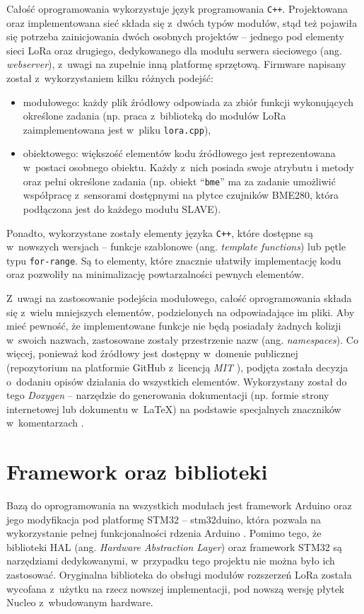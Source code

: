 Całość oprogramowania wykorzystuje język programowania \texttt{C++}. Projektowana oraz implementowana sieć składa się
z~dwóch typów modułów, stąd też pojawiła się potrzeba zainicjowania dwóch osobnych projektów -- jednego pod elementy
sieci LoRa oraz drugiego, dedykowanego dla modułu serwera sieciowego (ang. \textsl{webserver}), z~uwagi na zupełnie inną
platformę sprzętową. Firmware napisany został z~wykorzystaniem kilku różnych podejść:
\begin{itemize}[label=--]
    \item modułowego: każdy plik źródłowy odpowiada za zbiór funkcji wykonujących określone zadania (np. praca
          z~biblioteką do modułów LoRa zaimplementowana jest w~pliku \texttt{lora.cpp}),
    \item obiektowego: większość elementów kodu źródłowego jest reprezentowana w~postaci osobnego obiektu. Każdy z~nich
          posiada swoje atrybutu i metody oraz pełni określone zadania (np. obiekt \enquote{\texttt{bme}} ma za zadanie
          umożliwić współpracę z~sensorami dostępnymi na płytce czujników BME280, która podłączona jest do każdego
          modułu SLAVE).
\end{itemize}
Ponadto, wykorzystane zostały elementy języka \texttt{C++}, które dostępne są w~nowszych wersjach -- funkcje szablonowe
(ang. \textsl{template functions}) lub pętle typu \texttt{for-range}. Są to elementy, które znacznie ułatwiły
implementację kodu oraz pozwoliły na minimalizację powtarzalności pewnych elementów.

Z~uwagi na zastosowanie podejścia modułowego, całość oprogramowania składa się z~wielu mniejszych elementów,
podzielonych na odpowiadające im pliki. Aby mieć pewność, że implementowane funkcje nie będą posiadały żadnych kolizji
w~swoich nazwach, zastosowane zostały przestrzenie nazw (ang. \textsl{namespaces}). Co więcej, ponieważ kod źródłowy
jest dostępny w~domenie publicznej (repozytorium na platformie GitHub z~licencją \textsl{MIT} \cite{snyk-sw-license}),
podjęta została decyzja o~dodaniu opisów działania do wszystkich elementów. Wykorzystany został do tego \textsl{Doxygen}
-- narzędzie do generowania dokumentacji (np. formie strony internetowej lub dokumentu w~\LaTeX) na podstawie
specjalnych znaczników w~komentarzach \cite{doxygen}.

\FloatBarrier
\section{Framework oraz biblioteki\label{sect:framework-libraries}} Bazą do oprogramowania na wszystkich modułach jest
framework Arduino oraz jego modyfikacja pod platformę STM32 -- stm32duino, która pozwala na wykorzystanie pełnej
funkcjonalności rdzenia Arduino \cite{stm32duino-docs}. Pomimo tego, że biblioteki HAL (ang. \textsl{Hardware
    Abstraction Layer}) oraz framework STM32 są narzędziami dedykowanymi, w~przypadku tego projektu nie można było ich
zastosować. Oryginalna biblioteka do obsługi modułów rozszerzeń LoRa została wycofana z~użytku na rzecz nowszej
implementacji, pod nowszą wersję płytek Nucleo z~wbudowanym hardware.

